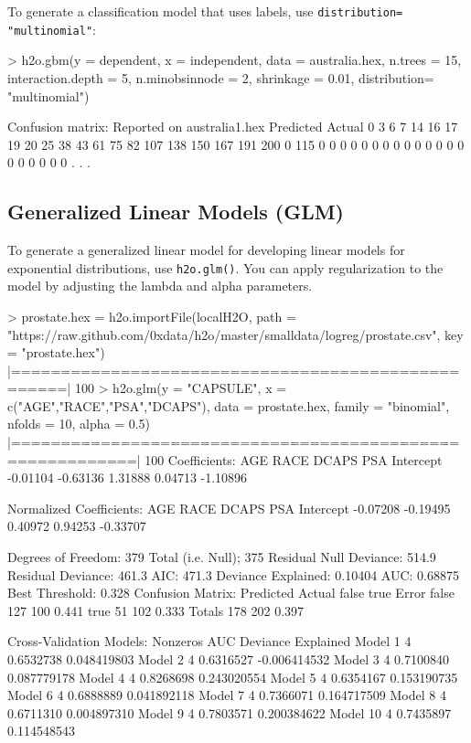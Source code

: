 \documentclass[11pt]{article}
\begin{document}
\begin{enumerate}
\begin{spverbatim}
\end{spverbatim}

To generate a classification model that uses labels, use {\texttt{distribution= "multinomial"}}: 
\begin{spverbatim}

> h2o.gbm(y = dependent, x = independent, data = australia.hex, n.trees
= 15, interaction.depth = 5,
 n.minobsinnode = 2, shrinkage = 0.01, distribution= "multinomial")
   
Confusion matrix:
Reported on australia1.hex
Predicted
Actual     0 3 6 7 14 16 17 19 20 25 38 43 61 75 82 107 138 150 167 191 200
  0      115 0 0 0  0  0  0  0  0  0  0  0  0  0  0   0   0   0   0   0   0
. . .
\end{spverbatim}

\subsection{Generalized Linear Models (GLM)}

To generate a generalized linear model for developing linear models for exponential distributions, use {\texttt{h2o.glm()}}. You can apply regularization to the model by adjusting the lambda and alpha parameters.  
\begin{spverbatim}

> prostate.hex = h2o.importFile(localH2O, path =
"https://raw.github.com/0xdata/h2o/master/smalldata/logreg/prostate.csv",
key = "prostate.hex")
       |===================================================| 100%
> h2o.glm(y = "CAPSULE", x = c("AGE","RACE","PSA","DCAPS"), data =
prostate.hex, family = "binomial", nfolds = 10, alpha = 0.5)
 |==========================================================| 100%
     Coefficients:
    AGE      RACE     DCAPS       PSA Intercept
       -0.01104  -0.63136   1.31888   0.04713  -1.10896

      Normalized Coefficients:
    AGE      RACE     DCAPS       PSA Intercept
       -0.07208  -0.19495   0.40972   0.94253  -0.33707

      Degrees of Freedom: 379 Total (i.e. Null);  375 Residual
      Null Deviance:     514.9
      Residual Deviance: 461.3  AIC: 471.3
      Deviance Explained: 0.10404
      AUC: 0.68875  Best Threshold: 0.328
    	Confusion Matrix:
      Predicted
      Actual   false true Error
      false    127  100 0.441
      true      51  102 0.333
      Totals   178  202 0.397

      Cross-Validation Models:
       Nonzeros       AUC Deviance Explained
      Model 1         4 0.6532738        0.048419803
      Model 2         4 0.6316527       -0.006414532
      Model 3         4 0.7100840        0.087779178
      Model 4         4 0.8268698        0.243020554
      Model 5         4 0.6354167        0.153190735
      Model 6         4 0.6888889        0.041892118
      Model 7         4 0.7366071        0.164717509
      Model 8         4 0.6711310        0.004897310
      Model 9         4 0.7803571        0.200384622
      Model 10        4 0.7435897        0.114548543
\end{spverbatim}


\end{enumerate}
\end{document}
